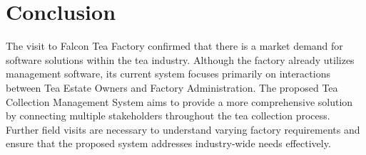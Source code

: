 \section*{Conclusion}
The visit to Falcon Tea Factory confirmed that there is a market demand for software solutions within the tea industry. Although the factory already utilizes management software, its current system focuses primarily on interactions between Tea Estate Owners and Factory Administration. The proposed Tea Collection Management System aims to provide a more comprehensive solution by connecting multiple stakeholders throughout the tea collection process. Further field visits are necessary to understand varying factory requirements and ensure that the proposed system addresses industry-wide needs effectively.
